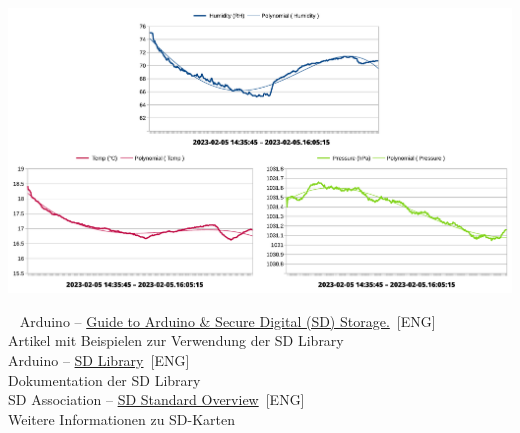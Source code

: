\documentclass[ngerman]{handout}
\begin{document}
\begin{multicols*}{2}
    \begin{center}
      \includegraphics[width=\linewidth]{media/data.pdf}
    \end{center}


  \end{multicols*}


  \begin{multicols}{2}
    
    
  \end{multicols}

  \newpage~\vfill
  Arduino -- \href{https://docs.arduino.cc/learn/programming/sd-guide}{Guide to Arduino \& Secure Digital (SD) Storage.}~[ENG]\\
  \hspace*{1em} {\footnotesize Artikel mit Beispielen zur Verwendung der SD Library}\\

  Arduino -- \href{hhttps://www.arduino.cc/reference/en/libraries/sd/}{SD Library}~[ENG]\\
  \hspace*{1em} {\footnotesize Dokumentation der SD Library}\\

  SD Association -- \href{https://www.sdcard.org/developers/}{SD Standard Overview}~[ENG]\\
  \hspace*{1em} {\footnotesize Weitere Informationen zu SD-Karten}\\
\end{document}
